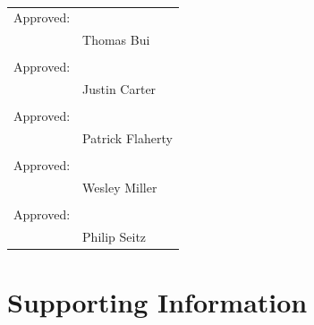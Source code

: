 \documentclass{article}
\begin{document}
\paragraph{}

\begin{tabular}{@{}p{.5in}p{4in}@{}}
Approved: & \hrulefill \\
& Thomas Bui \\
\\
Approved: & \hrulefill \\
& Justin Carter \\
\\
Approved: & \hrulefill \\
& Patrick Flaherty \\
\\
Approved: & \hrulefill \\
& Wesley Miller \\
\\
Approved: & \hrulefill \\
& Philip Seitz \\

\end{tabular}

\section{Supporting Information}
    
    \listoffigures
    \printindex
    
    \appendix
    
\end{document}
